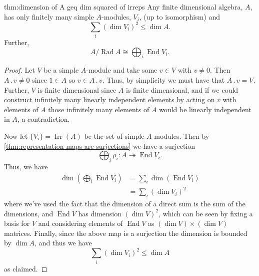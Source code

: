 \documentclass[fleqn]{NotesClass}
\DeclareMathOperator{\End}{End}
\newcommand{\action}{\mathbin{.}}
\newcommand{\isomorphic}{\cong}
\DeclareMathOperator{\Rad}{Rad}
\DeclareMathOperator{\Irr}{Irr}
\begin{document}
    \begin{thm}{}{thm:dimension of A geq dim squared of irreps}
        Any finite dimensional algebra, \(A\), has only finitely many simple \(A\)-modules, \(V_i\), (up to isomorphism) and
        \begin{equation}
            \sum_i (\dim V_i)^2 \le \dim A.
        \end{equation}
        Further,
        \begin{equation}
            A / \Rad A \isomorphic \bigoplus_i \End V_i.
        \end{equation}
        \begin{proof}
            Let \(V\) be a simple \(A\)-module and take some \(v \in V\) with \(v \ne 0\).
            Then \(A \action v \ne 0\) since \(1 \in A\) so \(v \in A \action v\).
            Thus, by simplicity we must have that \(A \action v = V\).
            Further, \(V\) is finite dimensional since \(A\) is finite dimensional, and if we could construct infinitely many linearly independent elements by acting on \(v\) with elements of \(A\) those infinitely many elements of \(A\) would be linearly independent in \(A\), a contradiction.
            
            Now let \(\{V_i\} = \Irr(A)\) be the set of simple \(A\)-modules.
            Then by \cref{thm:representation maps are surjections} we have a surjection
            \begin{equation}
                \bigoplus_i \rho_i \colon A \twoheadrightarrow \End V_i.
            \end{equation}
            Thus, we have
            \begin{align}
                \dim \left( {\textstyle\bigoplus_{i}} \End V_i\right) &= {\textstyle\sum_i} \dim( \End V_i)\\
                &= {\textstyle\sum_i} (\dim V_i)^2
            \end{align}
            where we've used the fact that the dimension of a direct sum is the sum of the dimensions, and \(\End V\) has dimension \((\dim V)^2\), which can be seen by fixing a basis for \(V\) and considering elements of \(\End V\) as \((\dim V) \times (\dim V)\) matrices.
            Finally, since the above map is a surjection the dimension is bounded by \(\dim A\), and thus we have
            \begin{equation}
                \sum_i (\dim V_i)^2 \le \dim A
            \end{equation}
            as claimed.
            

\end{proof}
\end{thm}
\end{document}
